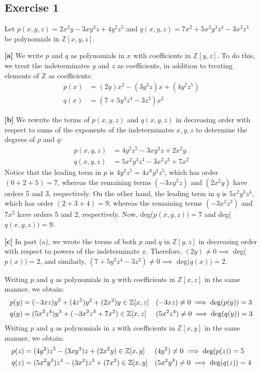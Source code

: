 \subsection*{Exercise 1}
Let $p(x,y,z) = 2x^2y - 3xy^3z + 4y^2z^5$ and $q(x,y,z) = 7x^2 + 5x^2y^3z^4 - 3x^2z^3$ be polynomials in $\mathbb{Z}[x,y,z]$.

\vspace{5 mm}
\textbf{[a]}
We write $p$ and $q$ as polynomials in $x$ with coefficients in $\mathbb{Z}[y,z]$. To do this, we treat the indeterminates $y$ and $z$ as coefficients, in addition to treating elements of $\mathbb{Z}$ as coefficients:
\begin{align*}
    p(x) &= (2y)x^2 - (3y^3z)x + (4y^2z^5) \\
    q(x) &= (7 + 5y^3z^4 - 3z^3)x^2
\end{align*}

\vspace{3 mm}
\textbf{[b]} We rewrite the terms of $p(x,y,z)$ and $q(x,y,z)$ in decreasing order with respect to sums of the exponents of the indeterminates $x,y,z$ to determine the degrees of $p$ and $q$:
\begin{align*}
    p(x,y,z) &= 4y^2z^5 - 3xy^3z + 2x^2y \\
    q(x,y,z) &= 5x^2y^3z^4 - 3x^2z^3 + 7x^2
\end{align*}
Notice that the leading term in $p$ is $4y^2z^5 = 4x^0y^2z^5$, which has order $(0 + 2 + 5) = 7$, whereas the remaining terms $(-3xy^3z)$ and $(2x^2y)$ have orders 5 and 3, respectively. On the other hand, the leading term in $q$ is $5x^2y^3z^4$, which has order $(2+3+4)=9$, whereas the remaining terms $(-3x^2z^3)$ and $7x^2$ have orders 5 and 2, respectively. Now, deg($p(x,y,z)) = 7$ and deg($q(x,y,z)) = 9$.

\vspace{5 mm}
\textbf{[c]}
In part (a), we wrote the terms of both $p$ and $q$ in $\mathbb{Z}[y,z]$ in decreasing order with respect to powers of the indeterminate $x$. Therefore, $(2y) \not= 0 \implies$ deg($p(x)) = 2$, and similarly, $(7 + 5y^3z^4 - 3z^3) \not= 0 \implies$ deg($q(x)) = 2$.

Writing $p$ and $q$ as polynomials in $y$ with coefficients in $\mathbb{Z}[x,z]$ in the same manner, we obtain: 
\begin{align*}
    p(y) &= (-3xz)y^3 + (4z^5)y^2 + (2x^2)y \in \mathbb{Z}[x,z] && (-3xz) \not=0 \implies \textnormal{deg}(p(y)) = 3 \\
    q(y) &= (5x^2z^4)y^3 + (-3x^2z^3 + 7x^2) \in \mathbb{Z}[x,z] && (5x^2z^4) \not=0 \implies \textnormal{deg}(q(y)) = 3
\end{align*}
Writing $p$ and $q$ as polynomials in $z$ with coefficients in $\mathbb{Z}[x,y]$ in the same manner, we obtain: 
\begin{align*}
    p(z) &= (4y^2)z^5 - (3xy^3)z + (2x^2y) \in \mathbb{Z}[x,y] && (4y^2) \not=0 \implies \textnormal{deg}(p(z)) = 5 \\
    q(z) &= (5x^2y^3)z^4 - (3x^2)z^3 + (7x^2) \in \mathbb{Z}[x,y] && (5x^2y^3) \not=0 \implies \textnormal{deg}(q(z)) = 4
\end{align*}

